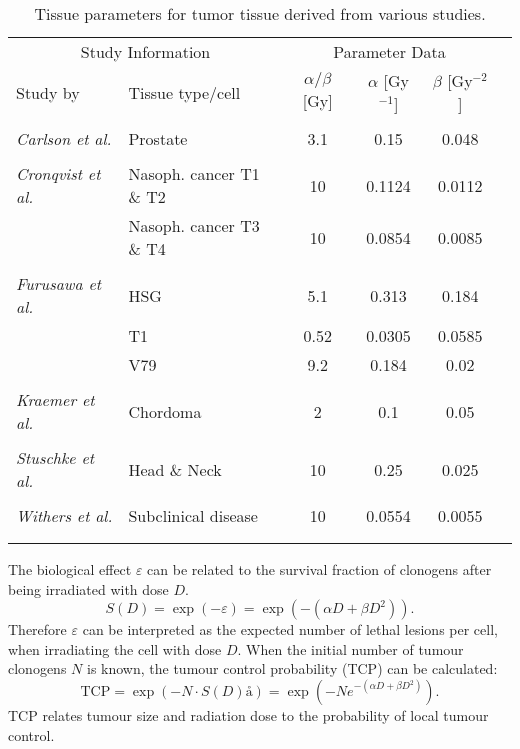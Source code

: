 \begin{table}[tbh]
\centering
\small
\begin{tabular}{llcccc}
\toprule
\multicolumn{2}{c}{Study Information} & \multicolumn{3}{c}{Parameter Data} \\
\cmidrule(r){1-2} \cmidrule(r){3-5}
Study by & Tissue type/cell & $\alpha/\beta$ [Gy] & $\alpha$ [Gy$^{-1}$] & $\beta$ [Gy$^{-2}$]\\
\midrule\\
\textit{Carlson et al.}\cite{pmid18363426}& Prostate & 3.1 & 0.15 & 0.048\\\\
\textit{Cronqvist et al.}\cite{CronqvistThesis}& Nasoph. cancer T1 \& T2 & 10 & 0.1124 & 0.0112\\
& Nasoph. cancer T3 \& T4 &10 & 0.0854 & 0.0085\\\\
\textit{Furusawa et al.}\cite{pmid11025645}& HSG & 5.1 & 0.313 & 0.184\\
& T1 &0.52 & 0.0305 & 0.0585\\
& V79 &9.2 & 0.184 & 0.02\\\\
\textit{Kraemer et al.}\cite{pmid11098906}& Chordoma & 2 & 0.1 & 0.05\\\\
\textit{Stuschke et al.}\cite{pmid10435801}& Head \& Neck & 10 & 0.25 & 0.025\\\\
\textit{Withers et al.}\cite{pmid7836089}& Subclinical disease & 10 & 0.0554 & 0.0055\\\\
\bottomrule\\
\end{tabular}
\caption{Tissue parameters for tumor tissue derived from various studies.}
\label{tab:tumortissueparameter}
\end{table}
The biological effect $\varepsilon$ can be related to the survival fraction of clonogens after being irradiated with dose $D$.
\begin{equation}
S(D) = \exp(-\varepsilon) = \exp(-(\alpha D + \beta D^2)).
\end{equation}
Therefore $\varepsilon$ can be interpreted as the expected number of lethal lesions per cell, when irradiating the cell with dose $D$. When the initial number of tumour clonogens $N$ is known, the tumour control probability (TCP) can be calculated:
\begin{equation}
\mathrm{TCP} = \exp(-N\cdot S(D)å) = \exp\left(-Ne^{-(\alpha D + \beta D^2)}\right).
\end{equation}
TCP relates tumour size and radiation dose to the probability of local tumour control.
